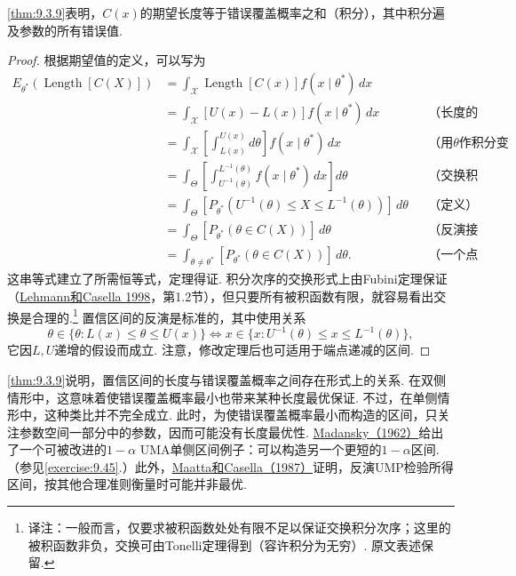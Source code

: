 \autoref{thm:9.3.9}表明，$C(x)$的期望长度等于错误覆盖概率之和（积分），其中积分遍及参数的所有错误值.
\begin{proof}
根据期望值的定义，可以写为
$$\begin{aligned}
E_{\theta^*}(\operatorname{Length}[C(X)])
&=\int_{\mathcal X}\operatorname{Length}[C(x)]f(x\mid\theta^*)\,dx\\
&=\int_{\mathcal X}[U(x)-L(x)]f(x\mid\theta^*)\,dx&&\text{（长度的定义）}\\
&=\int_{\mathcal X}\left[\int_{L(x)}^{U(x)}d\theta\right]f(x\mid\theta^*)\,dx&&\text{（用$\theta$作积分变量）}\\
&=\int_\Theta\left[\int_{U^{-1}(\theta)}^{L^{-1}(\theta)}f(x\mid\theta^*)\,dx\right]d\theta&&\text{（交换积分次序，见下文）}\\
&=\int_\Theta[P_{\theta^*}(U^{-1}(\theta)\le X\le L^{-1}(\theta))]\,d\theta&&\text{（定义）}\\
&=\int_\Theta[P_{\theta^*}(\theta\in C(X))]\,d\theta&&\text{（反演接受域）}\\
&=\int_{\theta\ne\theta^*}[P_{\theta^*}(\theta\in C(X))]\,d\theta.&&\text{（一个点不改变积分值）}
\end{aligned}$$
这串等式建立了所需恒等式，定理得证. 积分次序的交换形式上由Fubini定理保证（\hyperref[bib:source200]{Lehmann和Casella 1998}，第1.2节），但只要所有被积函数有限，就容易看出交换是合理的.\footnote{译注：一般而言，仅要求被积函数处处有限不足以保证交换积分次序；这里的被积函数非负，交换可由Tonelli定理得到（容许积分为无穷）. 原文表述保留.} 置信区间的反演是标准的，其中使用关系
$$\theta\in\{\theta:L(x)\le\theta\le U(x)\}\iff x\in\{x:U^{-1}(\theta)\le x\le L^{-1}(\theta)\},$$
它因$L,U$递增的假设而成立. 注意，修改定理后也可适用于端点递减的区间.
\end{proof}
\autoref{thm:9.3.9}说明，置信区间的长度与错误覆盖概率之间存在形式上的关系. 在双侧情形中，这意味着使错误覆盖概率最小也带来某种长度最优保证. 不过，在单侧情形中，这种类比并不完全成立. 此时，为使错误覆盖概率最小而构造的区间，只关注参数空间一部分中的参数，因而可能没有长度最优性. \hyperref[bib:source213]{Madansky（1962）}给出了一个可被改进的$1-\alpha$ UMA单侧区间例子：可以构造另一个更短的$1-\alpha$区间.（参见\autoref{exercise:9.45}.）此外，\hyperref[bib:source212]{Maatta和Casella（1987）}证明，反演UMP检验所得区间，按其他合理准则衡量时可能并非最优.
